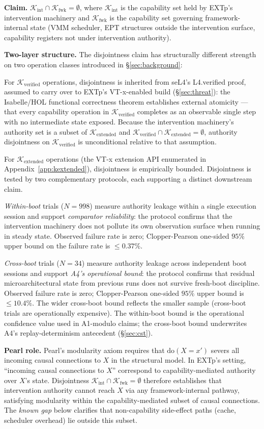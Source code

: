 \documentclass[conference]{IEEEtran}
\newcommand{\Kverified}{\mathcal{K}_\text{verified}}
\newcommand{\Kextended}{\mathcal{K}_\text{extended}}
\newcommand{\Kint}{\mathcal{K}_\text{int}}
\newcommand{\Kfwk}{\mathcal{K}_\text{fwk}}
\newcommand{\dox}[1]{\text{do}(X{=}#1)}
\begin{document}
\textbf{Claim.} $\Kint \cap \Kfwk = \emptyset$, where $\Kint$ is the
capability set held by EXTp's intervention machinery and $\Kfwk$ is
the capability set governing framework-internal state (VMM
scheduler, EPT structures outside the intervention surface,
capability registers not under intervention authority).

\textbf{Two-layer structure.} The disjointness claim has structurally
different strength on two operation classes introduced in
\S\ref{sec:background}:

For $\Kverified$ operations, disjointness is inherited from seL4's
L4.verified proof, assumed to carry over to EXTp's VT-x-enabled build
(\S\ref{sec:threat}): the Isabelle/HOL functional correctness theorem
establishes external atomicity --- that every capability operation
in $\Kverified$ completes as an observable single step with no
intermediate state exposed. Because the intervention machinery's
authority set is a subset of $\Kextended$ and $\Kverified \cap
\Kextended = \emptyset$, authority disjointness on $\Kverified$ is
unconditional relative to that assumption.

For $\Kextended$ operations (the VT-x extension API enumerated in
Appendix~\ref{app:kextended}), disjointness is empirically bounded.
Disjointness is tested by two complementary protocols, each
supporting a distinct downstream claim.

\textit{Within-boot} trials ($N{=}998$) measure authority leakage
within a single execution session and support \emph{comparator
reliability}: the protocol confirms that the intervention
machinery does not pollute its own observation surface when
running in steady state. Observed failure rate is zero;
Clopper-Pearson one-sided $95\%$ upper bound on the failure rate
is $\leq 0.37\%$.

\textit{Cross-boot} trials ($N{=}34$) measure authority leakage
across independent boot sessions and support \emph{A4's
operational bound}: the protocol confirms that residual
microarchitectural state from previous runs does not survive
fresh-boot discipline. Observed failure rate is zero;
Clopper-Pearson one-sided $95\%$ upper bound is $\leq 10.4\%$.
The wider cross-boot bound reflects the smaller sample (cross-boot
trials are operationally expensive). The within-boot bound is
the operational confidence value used in A1-modulo claims; the
cross-boot bound underwrites A4's replay-determinism antecedent
(\S\ref{sec:cst}).

\textbf{Pearl role.} Pearl's modularity axiom requires that
$\dox{x'}$ severs all incoming causal connections to $X$ in the
structural model. In EXTp's setting, ``incoming causal connections
to $X$'' correspond to capability-mediated authority over $X$'s
state. Disjointness $\Kint \cap \Kfwk = \emptyset$ therefore
establishes that intervention authority cannot reach $X$ via any
framework-internal pathway, satisfying modularity within the
capability-mediated subset of causal connections. The \emph{known
gap} below clarifies that non-capability side-effect paths (cache,
scheduler overhead) lie outside this subset.
\end{document}
